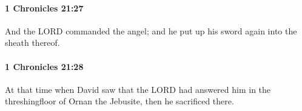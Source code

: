 		\paragraph{1 Chronicles 21:27} %
			\label{1CHRONICLES-21-27}

			And the LORD commanded the angel; and he put up his sword again into the sheath thereof.


		\paragraph{1 Chronicles 21:28} %
			\label{1CHRONICLES-21-28}

			At that time when David saw that the LORD had answered him in the threshingfloor of Ornan the Jebusite, then he sacrificed there.


